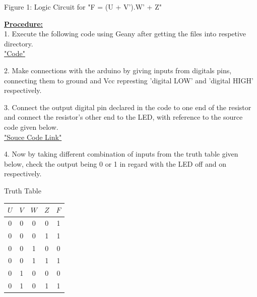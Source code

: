 \documentclass[10pt,a4paper]{report}
\begin{document}
\begin{multicols}{2}
\centering Figure 1: Logic Circuit for "F = (U + V').W' + Z" \vspace{15mm}
\\ \raggedright \large \textbf{\underline{Procedure:}} \normalsize \vspace{2mm}
\\ 1. Execute the following code using Geany after getting the files into respetive directory.
\\ \centering \underline{\href{https://github.com/BoleManideep/FWC_module1/tree/main/Assignments/assembly/codes}{"Code"}} \vspace{2mm}
\\ \raggedright 2. Make connections with the arduino by giving inputs from digitals pins, connecting them to ground and Vcc represting 'digital LOW' and 'digital HIGH' respectively. \vspace{2mm} 
\\ \raggedright 3. Connect the output digital pin declared in the code to one end of the resistor and connect the resistor's other end to the LED, with reference to the source code given below. \vspace{2mm}
\\ \centering \underline{\href{https://github.com/BoleManideep/FWC_module1/blob/main/Assignments/assembly/codes/Assignment.asm}{"Souce Code Link"}} \vspace{2mm}
\\ \raggedright 4. Now by taking different combination of inputs from the truth table given below, check the output being 0 or 1 in regard with the LED off and on respectively. \vspace{5mm}
\\ \begin{center}
	Truth Table \vspace{2mm} \\
    \setlength{\arrayrulewidth}{0.5mm}\setlength{\tabcolsep}{18pt}
\renewcommand{\arraystretch}{1.5}
    \begin{tabular}{|c|c|c|c|c|}
    \hline 
    \textbf{$U$} & \textbf{$V$} & \textbf{$W$} & \textbf{$Z$} & \textbf{$F$}\\
      \hline
      0 & 0 & 0 & 0 & 1\\
      0 & 0 & 0 & 1 & 1\\
      0 & 0 & 1 & 0 & 0\\
      0 & 0 & 1 & 1 & 1\\
      0 & 1 & 0 & 0 & 0\\
      0 & 1 & 0 & 1 & 1\\

\end{tabular}
\end{center}
\end{multicols}
\end{document}
